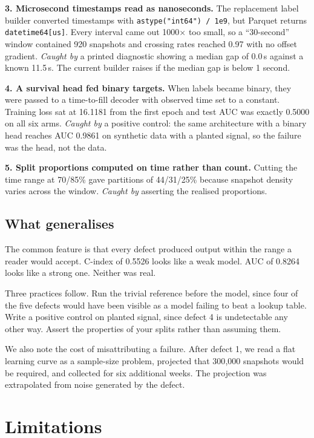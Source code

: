 \documentclass[11pt]{article}
\begin{document}
\textbf{3. Microsecond timestamps read as nanoseconds.} The replacement label
builder converted timestamps with \texttt{astype("int64") / 1e9}, but Parquet
returns \texttt{datetime64[us]}. Every interval came out 1000$\times$ too
small, so a ``30-second'' window contained 920 snapshots and crossing rates reached
0.97 with no offset gradient. \emph{Caught by} a printed diagnostic showing a
median gap of 0.0\,s against a known 11.5\,s. The current builder raises if the
median gap is below 1 second.

\textbf{4. A survival head fed binary targets.} When labels became binary,
they were passed to a time-to-fill decoder with observed time set to a
constant. Training loss sat at 16.1181 from the first epoch and test AUC was
exactly 0.5000 on all six arms. \emph{Caught by} a positive control: the same
architecture with a binary head reaches AUC 0.9861 on synthetic data with a
planted signal, so the failure was the head, not the data.

\textbf{5. Split proportions computed on time rather than count.} Cutting the
time range at 70/85\% gave partitions of 44/31/25\% because snapshot density
varies across the window. \emph{Caught by} asserting the realised proportions.

\subsection{What generalises}

The common feature is that every defect produced output within the range a
reader would accept. C-index of 0.5526 looks like a weak model. AUC of 0.8264
looks like a strong one. Neither was real.

Three practices follow. Run the trivial reference before the model, since four
of the five defects would have been visible as a model failing to beat a lookup
table. Write a positive control on planted signal, since defect 4 is
undetectable any other way. Assert the properties of your splits rather than
assuming them.

We also note the cost of misattributing a failure. After defect 1, we read a
flat learning curve as a sample-size problem, projected that 300{,}000
snapshots would be required, and collected for six additional weeks. The
projection was extrapolated from noise generated by the defect.

\section{Limitations}
\end{document}
